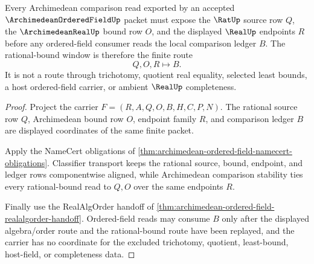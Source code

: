 \begin{theorem}
\label{thm:archimedean-ordered-field-rational-bound-window}
Every Archimedean comparison read exported by an accepted $\ArchimedeanOrderedFieldUp$ packet must expose the $\RatUp$ source row $Q$, the $\ArchimedeanRealUp$ bound row $O$, and the displayed $\RealUp$ endpoints $R$ before any ordered-field consumer reads the local comparison ledger $B$. The rational-bound window is therefore the finite route
$$
Q,O,R \longmapsto B .
$$
It is not a route through trichotomy, quotient real equality, selected least bounds, a host ordered-field carrier, or ambient $\RealUp$ completeness.
\end{theorem}
\begin{proof}
Project the carrier $F=(R,A,Q,O,B,H,C,P,N)$. The rational source row $Q$, Archimedean bound row $O$, endpoint family $R$, and comparison ledger $B$ are displayed coordinates of the same finite packet.

Apply the NameCert obligations of \autoref{thm:archimedean-ordered-field-namecert-obligations}. Classifier transport keeps the rational source, bound, endpoint, and ledger rows componentwise aligned, while Archimedean comparison stability ties every rational-bound read to $Q,O$ over the same endpoints $R$.

Finally use the RealAlgOrder handoff of \autoref{thm:archimedean-ordered-field-realalgorder-handoff}. Ordered-field reads may consume $B$ only after the displayed algebra/order route and the rational-bound route have been replayed, and the carrier has no coordinate for the excluded trichotomy, quotient, least-bound, host-field, or completeness data.
\end{proof}

